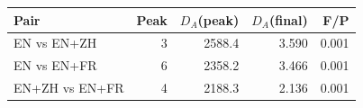 \begin{tabular}{@{}lrrrr@{}}
\toprule
Pair & Peak & $D_A$(peak) & $D_A$(final) & F/P \\
\midrule
EN vs EN+ZH & 3 & 2588.4 & 3.590 & 0.001 \\
EN vs EN+FR & 6 & 2358.2 & 3.466 & 0.001 \\
EN+ZH vs EN+FR & 4 & 2188.3 & 2.136 & 0.001 \\
\bottomrule
\end{tabular}
